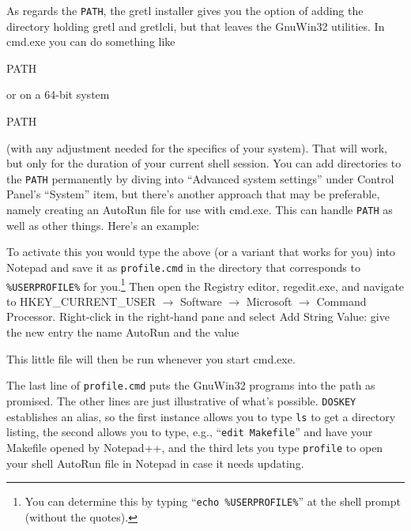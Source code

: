\documentclass[oneside]{book}
\begin{document}
As regards the \texttt{PATH}, the gretl installer gives you the option
of adding the directory holding \textsf{gretl} and \textsf{gretlcli},
but that leaves the \textsf{GnuWin32} utilities. In \textsf{cmd.exe}
you can do something like
\begin{code}
PATH %
\end{code}
or on a 64-bit system
\begin{code}
PATH %
\end{code}
(with any adjustment needed for the specifics of your system). That
will work, but only for the duration of your current shell session.
You can add directories to the \texttt{PATH} permanently by diving
into ``Advanced system settings'' under Control Panel's ``System''
item, but there's another approach that may be preferable, namely
creating an AutoRun file for use with \textsf{cmd.exe}. This can
handle \texttt{PATH} as well as other things. Here's an example:
%
To activate this you would type the above (or a variant that works for
you) into \textsf{Notepad} and save it as \texttt{profile.cmd} in the
directory that corresponds to \texttt{\%USERPROFILE\%} for
you.\footnote{You can determine this by typing
  ``\verb|echo %USERPROFILE%|'' at the shell prompt (without the
  quotes).}  Then open the Registry editor, \textsf{regedit.exe}, and
navigate to HKEY\_CURRENT\_USER $\rightarrow$ Software $\rightarrow$
Microsoft $\rightarrow$ Command Processor.  Right-click in the
right-hand pane and select Add String Value: give the new entry the
name \textsf{AutoRun} and the value
\begin{code}
\end{code}
This little file will then be run whenever you start \textsf{cmd.exe}.

The last line of \texttt{profile.cmd} puts the \textsf{GnuWin32}
programs into the path as promised. The other lines are just
illustrative of what's possible. \texttt{DOSKEY} establishes an alias,
so the first instance allows you to type \texttt{ls} to get a
directory listing, the second allows you to type, e.g., ``\texttt{edit
  Makefile}'' and have your Makefile opened by \textsf{Notepad++}, and
the third lets you type \texttt{profile} to open your shell AutoRun
file in Notepad in case it needs updating.
\end{document}

